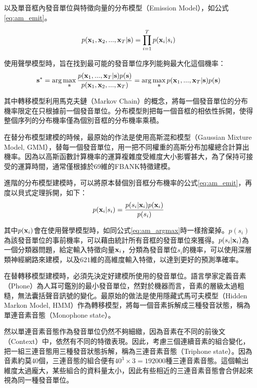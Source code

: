 以及單音框內發音單位與特徵向量的分布模型（Emission Model），如公式\ref{eq:am_emit}。

\begin{equation}\label{eq:am_emit}
p( \bold{x}_1 , \bold{x}_2 , ... , \bold{x}_T | \bold{s} ) = \prod_{i = 1}^{T} p( \bold{x}_i | s_i )
\end{equation}

使用聲學模型時，旨在找到最可能的發音單位序列能夠最大化這個機率：
\begin{equation}\label{eq:am_argmax}
 \bold{s}^* =  \arg\max_{\bold{s} } \frac{ p( \bold{x}_1 , ... , \bold{x}_T | \bold{s} ) p( \bold{s} ) } { p( \bold{x}_1 , \bold{x}_2 , ... , \bold{x}_T ) } = \arg\max_{\bold{s} }  p( \bold{x}_1 , ... , \bold{x}_T  | \bold{s} ) p( \bold{s} ) 
\end{equation}

其中轉移模型利用馬克夫鏈（Markov Chain）的概念，將每一個發音單位的分布機率限定在只根據前一個發音單位。分布模型則把每一個音框的相依性拆開，使得整個序列的分布機率僅為個別音框的分布機率乘積。

在替分布模型建模的時候，最原始的作法是使用高斯混和模型（Gaussian Mixture Model, GMM），替每一個發音單位，用一把不同權重的高斯分布加權總合計算出機率。因為以高斯函數計算機率的運算複雜度受維度大小影響甚大，為了保持可接受的運算時間，通常僅根據於69維的FBANK特徵建模。

進階的分布模型建模時，可以將原本替個別音框分布機率的公式\ref{eq:am_emit}，再度以貝式定理拆開，如下：
\begin{equation}\label{eq:am_emit_framewise}
p( \bold{x}_i | s_i ) = \frac{ p( s_i | \bold{x}_i) p( \bold{x}_i ) } { p ( s_i )}
\end{equation}

其中$p(\bold{x}_i )$會在使用聲學模型時，如同公式\ref{eq:am_argmax}時一樣捨棄掉。$p( s_i )$為該發音單位的事前機率，可以藉由統計所有音框的發音單位來獲得。$p( s_i | \bold{x}_i )$為一個分類器問題，給定輸入特徵向量$\bold{x}_i$，分類為發音單位$s_i$的機率，可以使用深層類神經網路來建模，以及$621$維的高維度輸入特徵，以達到更好的預測準確率。

在替轉移模型建模時，必須先決定好建模所使用的發音單位。語言學家定義音素（Phone）為人耳可鑑別的最小發音單位，然對於機器而言，音素的層級太過粗糙，無法囊括聲音訊號的變化。最原始的做法是使用隱藏式馬可夫模型（Hidden Markon Model, HMM）作為轉移模型，將每一個音素拆解成三種發音狀態，稱為單連音素音態（Monophone state）。

然以單連音素音態作為發音單位仍然不夠細緻，因為音素在不同的前後文（Context）中，依然有不同的特徵表現。因此，考慮三個連續音素的組合變化，把一組三連音態用三種發音狀態拆解，稱為三連音素音態（Triphone state）。因為音素約莫40個，三連音態的組合便有$40^3 \times 3= 192000$種三連音素音態。這個輸出維度太過龐大，某些組合的資料量太小，因此有些相近的三連音素音態會合併起來視為同一種發音單位。

